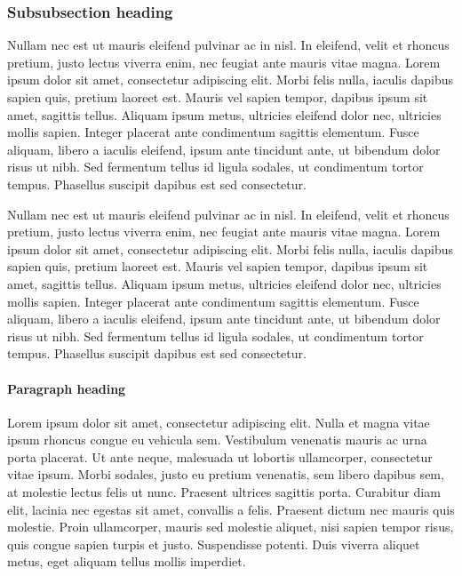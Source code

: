 \documentclass[\pandocDocMode,longtable,noextraspace,floatsintext]{apa6}
\begin{document}
\hypertarget{subsubsection-heading}{%
\subsubsection{Subsubsection heading}\label{subsubsection-heading}}

Nullam nec est ut mauris eleifend pulvinar ac in nisl. In eleifend,
velit et rhoncus pretium, justo lectus viverra enim, nec feugiat ante
mauris vitae magna. Lorem ipsum dolor sit amet, consectetur adipiscing
elit. Morbi felis nulla, iaculis dapibus sapien quis, pretium laoreet
est. Mauris vel sapien tempor, dapibus ipsum sit amet, sagittis tellus.
Aliquam ipsum metus, ultricies eleifend dolor nec, ultricies mollis
sapien. Integer placerat ante condimentum sagittis elementum. Fusce
aliquam, libero a iaculis eleifend, ipsum ante tincidunt ante, ut
bibendum dolor risus ut nibh. Sed fermentum tellus id ligula sodales, ut
condimentum tortor tempus. Phasellus suscipit dapibus est sed
consectetur.

Nullam nec est ut mauris eleifend pulvinar ac in nisl. In eleifend,
velit et rhoncus pretium, justo lectus viverra enim, nec feugiat ante
mauris vitae magna. Lorem ipsum dolor sit amet, consectetur adipiscing
elit. Morbi felis nulla, iaculis dapibus sapien quis, pretium laoreet
est. Mauris vel sapien tempor, dapibus ipsum sit amet, sagittis tellus.
Aliquam ipsum metus, ultricies eleifend dolor nec, ultricies mollis
sapien. Integer placerat ante condimentum sagittis elementum. Fusce
aliquam, libero a iaculis eleifend, ipsum ante tincidunt ante, ut
bibendum dolor risus ut nibh. Sed fermentum tellus id ligula sodales, ut
condimentum tortor tempus. Phasellus suscipit dapibus est sed
consectetur.

\hypertarget{paragraph-heading}{%
\paragraph{Paragraph heading}\label{paragraph-heading}}

Lorem ipsum dolor sit amet, consectetur adipiscing elit. Nulla et magna
vitae ipsum rhoncus congue eu vehicula sem. Vestibulum venenatis mauris
ac urna porta placerat. Ut ante neque, malesuada ut lobortis
ullamcorper, consectetur vitae ipsum. Morbi sodales, justo eu pretium
venenatis, sem libero dapibus sem, at molestie lectus felis ut nunc.
Praesent ultrices sagittis porta. Curabitur diam elit, lacinia nec
egestas sit amet, convallis a felis. Praesent dictum nec mauris quis
molestie. Proin ullamcorper, mauris sed molestie aliquet, nisi sapien
tempor risus, quis congue sapien turpis et justo. Suspendisse potenti.
Duis viverra aliquet metus, eget aliquam tellus mollis imperdiet.
\end{document}
